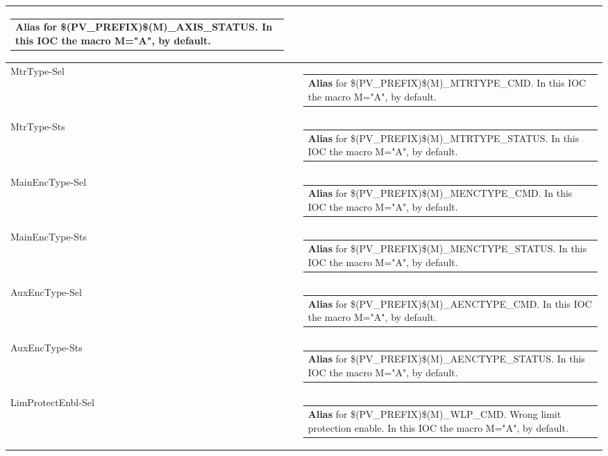 \documentclass[openany]{article}
\begin{document}
\begin{longtable}{| m{4.5cm} m{2.5cm}  m{8.0cm} |}
\begin{tabular}{@{}m{6cm}@{}}
                \textbf{Alias} for \$(PV\_PREFIX)\$(M)\_AXIS\_STATUS. In this IOC the macro M="A", by default.
            \end{tabular} \hypertarget{}{}\\ \hline
        MtrType-Sel &  & \begin{tabular}{@{}m{6cm}@{}}
                \textbf{Alias} for \$(PV\_PREFIX)\$(M)\_MTRTYPE\_CMD. In this IOC the macro M="A", by default.
            \end{tabular} \hypertarget{}{}\\ \hline
        MtrType-Sts &  & \begin{tabular}{@{}m{6cm}@{}}
                \textbf{Alias} for \$(PV\_PREFIX)\$(M)\_MTRTYPE\_STATUS. In this IOC the macro M="A", by default.
            \end{tabular} \hypertarget{}{}\\ \hline
        MainEncType-Sel &  & \begin{tabular}{@{}m{6cm}@{}}
                \textbf{Alias} for \$(PV\_PREFIX)\$(M)\_MENCTYPE\_CMD. In this IOC the macro M="A", by default.
            \end{tabular} \hypertarget{}{}\\ \hline
        MainEncType-Sts &  & \begin{tabular}{@{}m{6cm}@{}}
                \textbf{Alias} for \$(PV\_PREFIX)\$(M)\_MENCTYPE\_STATUS. In this IOC the macro M="A", by default.
            \end{tabular} \hypertarget{}{}\\ \hline
        AuxEncType-Sel &  & \begin{tabular}{@{}m{6cm}@{}}
                \textbf{Alias} for \$(PV\_PREFIX)\$(M)\_AENCTYPE\_CMD. In this IOC the macro M="A", by default.
            \end{tabular} \hypertarget{}{}\\ \hline
        AuxEncType-Sts &  & \begin{tabular}{@{}m{6cm}@{}}
                \textbf{Alias} for \$(PV\_PREFIX)\$(M)\_AENCTYPE\_STATUS. In this IOC the macro M="A", by default.
            \end{tabular} \hypertarget{}{}\\ \hline
        LimProtectEnbl-Sel &  & \begin{tabular}{@{}m{6cm}@{}}
                \textbf{Alias} for \$(PV\_PREFIX)\$(M)\_WLP\_CMD. Wrong limit protection enable. In this IOC the macro M="A", by default.

\end{tabular}
\end{longtable}
\end{document}
